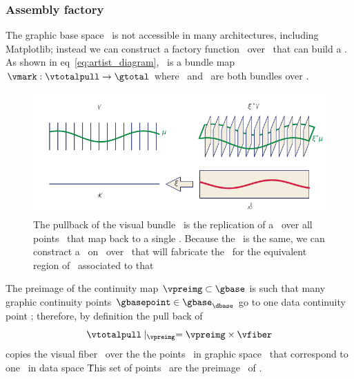 \documentclass[../main.tex]{subfiles}
\begin{document}
\subsubsection{Assembly factory \vmarkd}
The graphic base space \gbase\ is not accessible in many architectures, including Matplotlib; instead we can construct a factory function \vmarkd\ over \dbase\ that can build a \vmark. As shown in eq~\ref{eq:artist_diagram}, \vmark\ is a bundle map $\vmark: \vtotalpull\rightarrow \gtotal$ where \vtotalpull\ and \gtotal\ are both bundles over \gbase.
\begin{figure}[H]
    \includegraphics[width=1\textwidth]{figures/math/q_hat.png}
    \caption{The pullback of the visual bundle \vtotalpull\ is the replication of a \vsection\ over all points \gbasepoint\ that map back to a single \dbasepoint. Because the \vsection\ is the same, we can constract a \vmarkd\ on \vsection\ over \dbasepoint\ that will fabricate the \vmark\ for the equivalent region of \gbasepoint\ associated to that \dbasepoint}
    \label{fig:artist_q_hat}
\end{figure}
 
The preimage of the continuity map $\vpreimg \subset \gbase$ is such that many graphic continuity points $\gbasepoint \in \gbase_{\dbase}$ go to one data continuity point \dbasepoint; therefore, by definition the pull back of \vsection\
\begin{equation}
    \vtotalpull \mid_{\vpreimg} = \vpreimg \times \vfiber
\end{equation}
copies the visual fiber \vfiber\ over the the points \gbasepoint\ in graphic space \gbase\ that correspond to one \dbasepoint\ in data space \dbase\. This set of points \gbasepoint\ are the preimage \vpreimg\ of \dbasepoint. 
\end{document}

